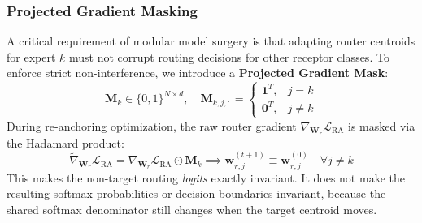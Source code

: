 \documentclass{article}
\theoremstyle{definition}
\begin{document}
\subsubsection{Projected Gradient Masking}
A critical requirement of modular model surgery is that adapting router centroids for expert $k$ must not corrupt routing decisions for other receptor classes. To enforce strict non-interference, we introduce a \textbf{Projected Gradient Mask}:
\begin{equation}
\mathbf{M}_k \in \{0, 1\}^{N \times d}, \quad \mathbf{M}_{k, j, :} = \begin{cases} \mathbf{1}^T, & j = k \\ \mathbf{0}^T, & j \neq k \end{cases}
\end{equation}
During re-anchoring optimization, the raw router gradient $\nabla_{\mathbf{W}_r} \mathcal{L}_{\text{RA}}$ is masked via the Hadamard product:
\begin{equation}
\tilde{\nabla}_{\mathbf{W}_r} \mathcal{L}_{\text{RA}} = \nabla_{\mathbf{W}_r} \mathcal{L}_{\text{RA}} \odot \mathbf{M}_k \implies \mathbf{w}_{r, j}^{(t+1)} \equiv \mathbf{w}_{r, j}^{(0)} \quad \forall j \neq k
\label{eq:projected_mask}
\end{equation}
This makes the non-target routing \emph{logits} exactly invariant. It does not make the resulting softmax probabilities or decision boundaries invariant, because the shared softmax denominator still changes when the target centroid moves.
\end{document}
